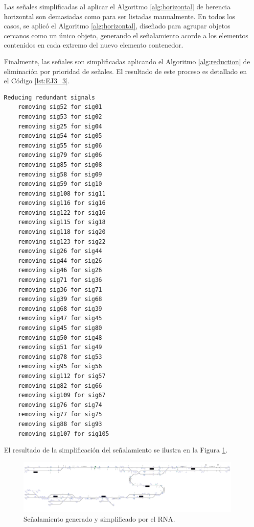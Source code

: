 	Las señales simplificadas al aplicar el Algoritmo \ref{alg:horizontal} de herencia horizontal son demasiadas como para ser listadas manualmente. En todos los casos, se aplicó el Algoritmo \ref{alg:horizontal}, diseñado para agrupar objetos cercanos como un único objeto, generando el señalamiento acorde a los elementos contenidos en cada extremo del nuevo elemento contenedor.
	
	Finalmente, las señales son simplificadas aplicando el Algoritmo \ref{alg:reduction} de eliminación por prioridad de señales. El resultado de este proceso es detallado en el Código \ref{lst:EJ3_3}.
	
	\begin{lstlisting}[language = {}, tabsize=4, basicstyle=\footnotesize\ttfamily, showspaces=false, showstringspaces=false, caption = Reducción de señalamiento por prioridad de señales, label = {lst:EJ3_3}]
	Reducing redundant signals
	removing sig52 for sig01
	removing sig53 for sig02
	removing sig25 for sig04
	removing sig54 for sig05
	removing sig55 for sig06
	removing sig79 for sig06
	removing sig85 for sig08
	removing sig58 for sig09
	removing sig59 for sig10
	removing sig108 for sig11
	removing sig116 for sig16
	removing sig122 for sig16
	removing sig115 for sig18
	removing sig118 for sig20
	removing sig123 for sig22
	removing sig26 for sig44
	removing sig44 for sig26
	removing sig46 for sig26
	removing sig71 for sig36
	removing sig36 for sig71
	removing sig39 for sig68
	removing sig68 for sig39
	removing sig47 for sig45
	removing sig45 for sig80
	removing sig50 for sig48
	removing sig51 for sig49
	removing sig78 for sig53
	removing sig95 for sig56
	removing sig112 for sig57
	removing sig82 for sig66
	removing sig109 for sig67
	removing sig76 for sig74
	removing sig77 for sig75
	removing sig88 for sig93
	removing sig107 for sig105
	\end{lstlisting}
	
	El resultado de la simplificación del señalamiento se ilustra en la Figura \ref{fig:EJ3_7}.
	
	\begin{figure}[H]
		\centering
		\includegraphics[width=1\textwidth]{resultados-obtenidos/ejemplo3/images/3_RNA.png}
		\centering\caption{Señalamiento generado y simplificado por el RNA.}
		\label{fig:EJ3_7}
	\end{figure}
	
